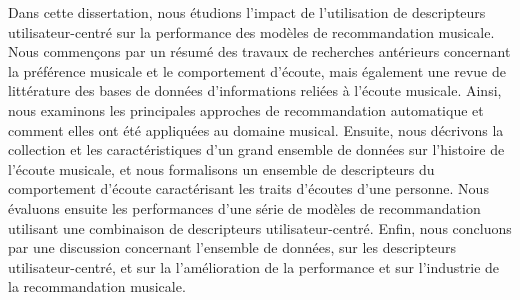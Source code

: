 \documentclass[12pt,letterpaper]{report}
\begin{document}
Dans cette dissertation, nous étudions l’impact de l’utilisation de descripteurs utilisateur-centré sur la performance des modèles de recommandation musicale. Nous commençons par un résumé des travaux de recherches antérieurs concernant la préférence musicale et le comportement d’écoute, mais également une revue de littérature des bases de données d’informations reliées à l’écoute musicale. Ainsi, nous examinons les principales approches de recommandation automatique et comment elles ont été appliquées au domaine musical. Ensuite, nous décrivons la collection et les caractéristiques d'un grand ensemble de données sur l’histoire de l'écoute musicale, et nous formalisons un ensemble de descripteurs du comportement d’écoute caractérisant les traits d’écoutes d’une personne. Nous évaluons ensuite les performances d’une série de modèles de recommandation utilisant une combinaison de descripteurs utilisateur-centré. Enfin, nous concluons par une discussion concernant l’ensemble de données, sur les descripteurs utilisateur-centré, et sur la l’amélioration de la performance et sur l’industrie de la recommandation musicale.








\end{document}

